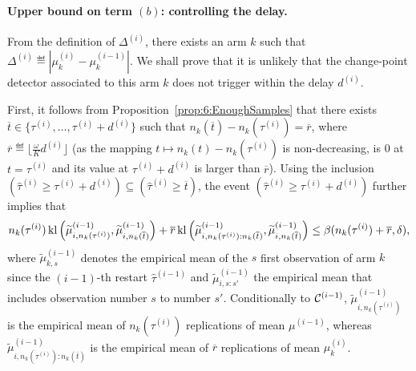 \paragraph{Upper bound on term $(b)$: controlling the delay.}
\label{par:6:controllingDelayInOneProof}
%
From the definition of $\Delta^{(i)}$, there exists an arm $k$ such that $\Delta^{(i)} \eqdef |\mu_k^{(i)} - \mu_k^{(i-1)}|$. We shall prove that it is unlikely that the change-point detector associated to this arm $k$ does not trigger within the delay $d^{(i)}$.

First, it follows from Proposition~\ref{prop:6:EnoughSamples} that there exists $\overline{t} \in \{\tau^{(i)}, \dots, \tau^{(i)} + d^{(i)} \}$ such that
$n_k(\overline{t}) - n_k(\tau^{(i)}) = \overline{r}$, where $\overline{r} \eqdef \lfloor \frac{\omega}{K} d^{(i)}\rfloor$
(as the mapping $t \mapsto n_k(t) - n_k(\tau^{(i)})$ is non-decreasing, is $0$ at $t=\tau^{(i)}$ and its value at $\tau^{(i)}+d^{(i)}$ is larger than $\overline{r}$).
Using the inclusion $\left(\widehat{\tau}^{(i)} \geq \tau^{(i)} + d^{(i)}\right) \subseteq \left(\widehat{\tau}^{(i)} \geq \overline{t}\right)$,
the event $\left(\widehat{\tau}^{(i)} \geq \tau^{(i)} + d^{(i)}\right)$ further implies that
\[
    n_k(\tau^{(i)}) \, \mathrm{kl}\left(\widetilde{\mu}^{(i-1)}_{i,n_k(\tau^{(i)})},\widetilde{\mu}^{(i-1)}_{i,n_k(\overline{t})}\right)
    + \overline{r} \, \mathrm{kl}\left(\widetilde{\mu}^{(i-1)}_{i,n_k(\tau^{(i)}) : n_k(\overline{t})},\widetilde{\mu}^{(i-1)}_{i,n_k(\overline{t})}\right) \leq \beta(n_k(\tau^{(i)}) + \overline{r},\delta),
\]
where $\widetilde{\mu}^{(i-1)}_{k,s}$ denotes the empirical mean of the $s$ first observation of arm $k$ since the $(i-1)$-th restart $\widehat{\tau}^{(i-1)}$ and  $\widetilde{\mu}^{(i-1)}_{i,s:s'}$ the empirical mean that includes observation number $s$ to number $s'$. Conditionally to $\mathcal{C}^{(i-1)}$, $\widetilde{\mu}^{(i-1)}_{i,n_k(\tau^{(i)})}$ is the empirical mean of $n_k(\tau^{(i)})$ \iid{} replications of mean $\mu^{(i-1)}$, whereas $\widetilde{\mu}^{(i-1)}_{i,n_k(\tau^{(i)}) : n_k(\overline{t})}$ is the empirical mean of $\overline{r}$ \iid{} replications of mean $\mu_k^{(i)}$.

